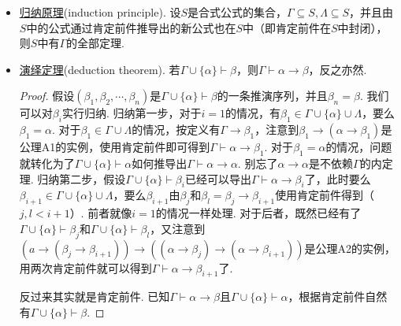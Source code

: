 \documentclass[main.tex]{subfiles}
\begin{document}
\begin{itemize}
    \item [(1)] \uline{归纳原理}(induction principle). 设\(S\)是合式公式的集合，\(\Gamma \subseteq S, \Lambda \subseteq S\)，并且由\(S\)中的公式通过肯定前件推导出的新公式也在\(S\)中（即肯定前件在\(S\)中封闭），则\(S\)中有\(\Gamma\)的全部定理.

    \item [(2)] \uline{演绎定理}(deduction theorem). 若\(\Gamma \cup \{\alpha\} \vdash \beta\)，则\(\Gamma \vdash \alpha \to \beta\)，反之亦然.
    \begin{proof}
        假设\((\beta_1,\beta_2,\cdots,\beta_n)\)是\(\Gamma \cup \{\alpha\} \vdash \beta\)的一条推演序列，并且\(\beta_n = \beta\). 我们可以对\(\beta_i\)实行归纳. \newline
        归纳第一步，对于\(i=1\)的情况，有\(\beta_1 \in \Gamma \cup \{\alpha\} \cup \Lambda\)，要么\(\beta_1 = \alpha\). 对于\(\beta_1 \in \Gamma \cup \Lambda\)的情况，按定义有\(\Gamma \to \beta_1\)，注意到\(\beta_1 \to (\alpha \to \beta_1)\)是公理A1的实例，使用肯定前件即可得到\(\Gamma \vdash \alpha \to \beta_1\). 对于\(\beta_1 = \alpha\)的情况，问题就转化为了\(\Gamma \cup \{\alpha\} \vdash \alpha\)如何推导出\(\Gamma \vdash \alpha \to \alpha\). 别忘了\(\alpha \to \alpha\)是不依赖\(\Gamma\)的内定理. \newline
        归纳第二步，假设\(\Gamma \cup \{\alpha\} \vdash \beta_i\)已经可以导出\(\Gamma \vdash \alpha \to \beta_i\)了，此时要么\(\beta_{i+1} \in \Gamma \cup \{\alpha\} \cup \Lambda\)，要么\(\beta_{i+1}\)由\(\beta_j\)和\(\beta_l = \beta_j \to \beta_{i+1}\)使用肯定前件得到（\(j,l < i+1\)）. 前者就像\(i=1\)的情况一样处理. 对于后者，既然已经有了\(\Gamma \cup \{\alpha\} \vdash \beta_j\)和\(\Gamma \cup \{\alpha\} \vdash \beta_l\)，又注意到\((a \to (\beta_j \to \beta_{i+1})) \to ((\alpha \to \beta_j) \to (\alpha \to \beta_{i+1}))\)是公理A2的实例，用两次肯定前件就可以得到\(\Gamma \vdash \alpha \to \beta_{i+1}\)了.

        反过来其实就是肯定前件. 已知\(\Gamma \vdash \alpha \to \beta\)且\(\Gamma \cup \{\alpha\} \vdash \alpha\)，根据肯定前件自然有\(\Gamma \cup \{\alpha\} \vdash \beta\).
    \end{proof}


\end{itemize}
\end{document}
